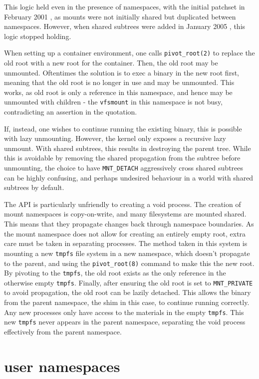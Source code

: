 \documentclass[12pt,a4paper,twoside]{report}
\begin{document}
This logic held even in the presence of namespaces, with the initial patchset in February 2001 \citep{viro_patch_2001}, as mounts were not initially shared but duplicated between namespaces. However, when shared subtrees were added in January 2005 \citep{viro_rfc_2005}, this logic stopped holding.

When setting up a container environment, one calls \texttt{pivot\_root(2)} to replace the old root with a new root for the container. Then, the old root may be unmounted. Oftentimes the solution is to exec a binary in the new root first, meaning that the old root is no longer in use and may be unmounted. This works, as old root is only a reference in this namespace, and hence may be unmounted with children - the \texttt{vfsmount} in this namespace is not busy, contradicting an assertion in the quotation.

If, instead, one wishes to continue running the existing binary, this is possible with lazy unmounting. However, the kernel only exposes a recursive lazy unmount. With shared subtrees, this results in destroying the parent tree. While this is avoidable by removing the shared propagation from the subtree before unmounting, the choice to have \texttt{MNT\_DETACH} aggressively cross shared subtrees can be highly confusing, and perhaps undesired behaviour in a world with shared subtrees by default.

The API is particularly unfriendly to creating a void process. The creation of mount namespaces is copy-on-write, and many filesystems are mounted shared. This means that they propagate changes back through namespace boundaries. As the mount namespace does not allow for creating an entirely empty root, extra care must be taken in separating processes. The method taken in this system is mounting a new \texttt{tmpfs} file system in a new namespace, which doesn't propagate to the parent, and using the \texttt{pivot\_root(8)} command to make this the new root. By pivoting to the \texttt{tmpfs}, the old root exists as the only reference in the otherwise empty \texttt{tmpfs}. Finally, after ensuring the old root is set to \texttt{MNT\_PRIVATE} to avoid propagation, the old root can be lazily detached. This allows the binary from the parent namespace, the shim in this case, to continue running correctly. Any new processes only have access to the materials in the empty \texttt{tmpfs}. This new \texttt{tmpfs} never appears in the parent namespace, separating the void process effectively from the parent namespace.

\section{user namespaces}
\label{sec:voiding-user}
\end{document}
